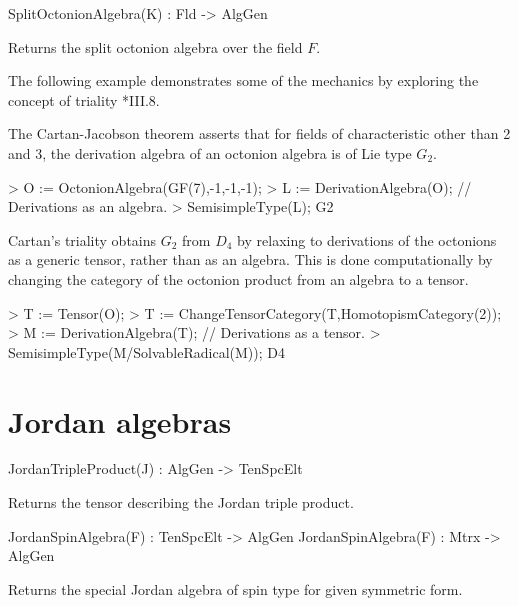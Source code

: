 \documentclass{documentation}
\begin{document}
\begin{intrinsics}
SplitOctonionAlgebra(K) : Fld -> AlgGen
\end{intrinsics}

Returns the split octonion algebra over the field $F$.


\begin{example}[TenTriality]
The following example demonstrates some of the mechanics by exploring
the concept of triality \cite{Schafer}*{III.8}.

The Cartan-Jacobson theorem asserts that for fields of characteristic other
than 2 and 3, the derivation algebra of an octonion algebra is of Lie type 
$G_2$.

\begin{code}
> O := OctonionAlgebra(GF(7),-1,-1,-1);
> L := DerivationAlgebra(O);   // Derivations as an algebra.
> SemisimpleType(L);
G2
\end{code}

Cartan's triality obtains $G_2$ from $D_4$ by relaxing to
derivations of the octonions as a generic tensor, rather than as an 
algebra.  
This is done computationally by changing the category of the octonion product
from an algebra to a tensor.

\begin{code}
> T := Tensor(O);
> T := ChangeTensorCategory(T,HomotopismCategory(2)); 
> M := DerivationAlgebra(T);  // Derivations as a tensor.
> SemisimpleType(M/SolvableRadical(M));
D4
\end{code}
\end{example}

\section{Jordan algebras}


\begin{intrinsics}
JordanTripleProduct(J) : AlgGen -> TenSpcElt
\end{intrinsics}

Returns the tensor describing the Jordan triple product.

\begin{intrinsics}
JordanSpinAlgebra(F) : TenSpcElt -> AlgGen
JordanSpinAlgebra(F) : Mtrx -> AlgGen
\end{intrinsics}

Returns the special Jordan algebra of spin type for given symmetric form.
\end{document}
